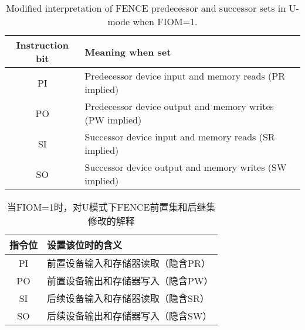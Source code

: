 \begin{table}[h!]
\begin{center}
\begin{tabular}{|c|l|}
\hline
Instruction bit & Meaning when set \\
\hline
PI & Predecessor device input and memory reads   (PR implied) \\
PO & Predecessor device output and memory writes (PW implied) \\
\hline
SI & Successor device input and memory reads     (SR implied) \\
SO & Successor device output and memory writes   (SW implied) \\
\hline
\end{tabular}
\end{center}
\vspace{-0.1in}
\caption{%
Modified interpretation of FENCE predecessor and successor sets in U-mode when FIOM=1.}
\label{tab:senvcfg-FIOM}
\end{table}

\begin{table}[h!]
\begin{center}
\begin{tabular}{|c|l|}
\hline
指令位 & 设置该位时的含义 \\
\hline
PI & 前置设备输入和存储器读取（隐含PR） \\
PO & 前置设备输出和存储器写入（隐含PW） \\
\hline
SI & 后续设备输入和存储器读取（隐含SR） \\
SO & 后续设备输出和存储器写入（隐含SW） \\
\hline
\end{tabular}
\end{center}
\vspace{-0.1in}
\caption{%
当FIOM=1时，对U模式下FENCE前置集和后继集修改的解释}
\label{tab:senvcfg-FIOM}
\end{table}

